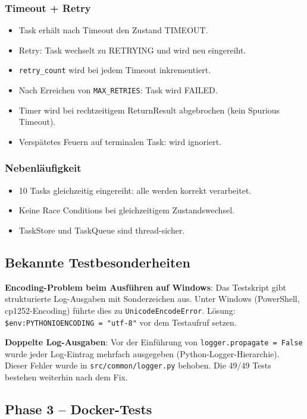 \subsubsection*{Timeout + Retry}
\begin{itemize}
  \item Task erhält nach Timeout den Zustand TIMEOUT.
  \item Retry: Task wechselt zu RETRYING und wird neu eingereiht.
  \item \texttt{retry\_count} wird bei jedem Timeout inkrementiert.
  \item Nach Erreichen von \texttt{MAX\_RETRIES}: Task wird FAILED.
  \item Timer wird bei rechtzeitigem ReturnResult abgebrochen (kein Spurious Timeout).
  \item Verspätetes Feuern auf terminalen Task: wird ignoriert.
\end{itemize}

\subsubsection*{Nebenläufigkeit}
\begin{itemize}
  \item 10 Tasks gleichzeitig eingereiht: alle werden korrekt verarbeitet.
  \item Keine Race Conditions bei gleichzeitigem Zustandswechsel.
  \item TaskStore und TaskQueue sind thread-sicher.
\end{itemize}

\subsection{Bekannte Testbesonderheiten}

\textbf{Encoding-Problem beim Ausführen auf Windows}:
Das Testskript gibt strukturierte Log-Ausgaben mit Sonderzeichen aus.
Unter Windows (PowerShell, cp1252-Encoding) führte dies zu
\texttt{UnicodeEncodeError}.
Lösung: \texttt{\$env:PYTHONIOENCODING = "utf-8"} vor dem Testaufruf setzen.

\noindent \textbf{Doppelte Log-Ausgaben}:
Vor der Einführung von \texttt{logger.propagate = False} wurde jeder
Log-Eintrag mehrfach ausgegeben (Python-Logger-Hierarchie).
Dieser Fehler wurde in \texttt{src/common/logger.py} behoben.
Die 49/49 Tests bestehen weiterhin nach dem Fix.

\subsection{Phase 3 -- Docker-Tests}

